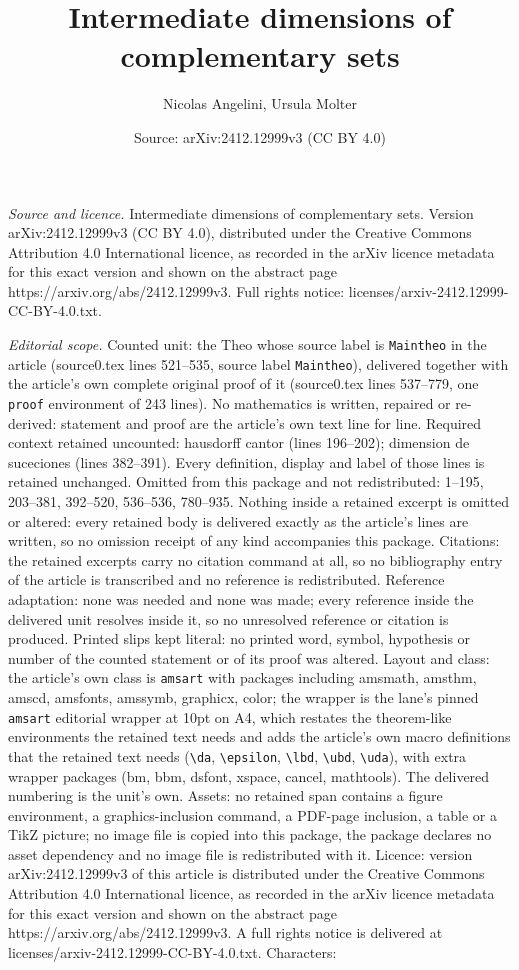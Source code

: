 \documentclass[10pt,a4paper]{amsart}
\title[Intermediate dimensions of complementary sets]{Intermediate dimensions of complementary sets}
\author{Nicolas Angelini, Ursula Molter}
\date{Source: arXiv:2412.12999v3 (CC BY 4.0)}
\begin{document}
\maketitle

\noindent\emph{Source and licence.} Intermediate dimensions of complementary sets. Version arXiv:2412.12999v3 (CC BY 4.0), distributed under the Creative Commons Attribution 4.0 International licence, as recorded in the arXiv licence metadata for this exact version and shown on the abstract page https://arxiv.org/abs/2412.12999v3. Full rights notice: licenses/arxiv-2412.12999-CC-BY-4.0.txt.\par\smallskip

\noindent\textit{Editorial scope.} Counted unit: the Theo whose source label is \texttt{Maintheo} in the article (source0.tex lines 521--535, source label \texttt{Maintheo}), delivered together with the article's own complete original proof of it (source0.tex lines 537--779, one \texttt{proof} environment of 243 lines). No mathematics is written, repaired or re-derived: statement and proof are the article's own text line for line. Required context retained uncounted: hausdorff cantor (lines 196--202); dimension de suceciones (lines 382--391). Every definition, display and label of those lines is retained unchanged. Omitted from this package and not redistributed: 1--195, 203--381, 392--520, 536--536, 780--935. Nothing inside a retained excerpt is omitted or altered: every retained body is delivered exactly as the article's lines are written, so no omission receipt of any kind accompanies this package. Citations: the retained excerpts carry no citation command at all, so no bibliography entry of the article is transcribed and no reference is redistributed. Reference adaptation: none was needed and none was made; every reference inside the delivered unit resolves inside it, so no unresolved reference or citation is produced. Printed slips kept literal: no printed word, symbol, hypothesis or number of the counted statement or of its proof was altered. Layout and class: the article's own class is \texttt{amsart} with packages including amsmath, amsthm, amscd, amsfonts, amssymb, graphicx, color; the wrapper is the lane's pinned \texttt{amsart} editorial wrapper at 10pt on A4, which restates the theorem-like environments the retained text needs and adds the article's own macro definitions that the retained text needs (\texttt{\textbackslash da}, \texttt{\textbackslash epsilon}, \texttt{\textbackslash lbd}, \texttt{\textbackslash ubd}, \texttt{\textbackslash uda}), with extra wrapper packages (bm, bbm, dsfont, xspace, cancel, mathtools). The delivered numbering is the unit's own. Assets: no retained span contains a figure environment, a graphics-inclusion command, a PDF-page inclusion, a table or a TikZ picture; no image file is copied into this package, the package declares no asset dependency and no image file is redistributed with it. Licence: version arXiv:2412.12999v3 of this article is distributed under the Creative Commons Attribution 4.0 International licence, as recorded in the arXiv licence metadata for this exact version and shown on the abstract page https://arxiv.org/abs/2412.12999v3. A full rights notice is delivered at licenses/arxiv-2412.12999-CC-BY-4.0.txt. Characters: 
\end{document}
